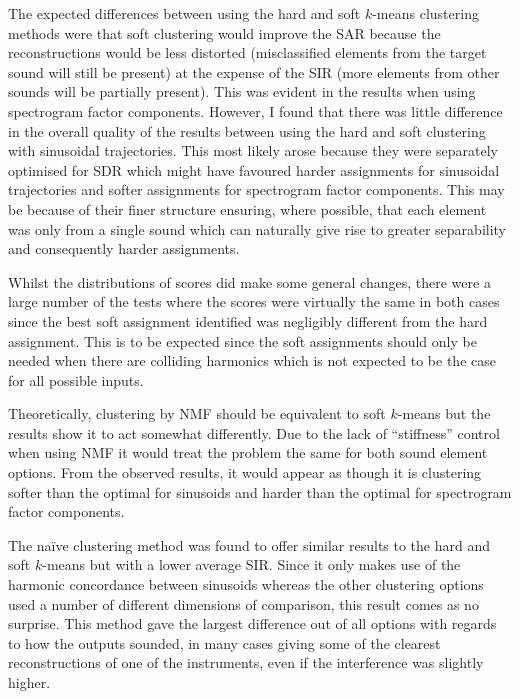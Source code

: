 \documentclass[12pt,a4paper,twoside,openright]{report}
\begin{document}

The expected differences between using the hard and soft $ k $-means clustering methods were that soft clustering would improve the SAR because the reconstructions would be less distorted (misclassified elements from the target sound will still be present) at the expense of the SIR (more elements from other sounds will be partially present). This was evident in the results when using spectrogram factor components. However, I found that there was little difference in the overall quality of the results between using the hard and soft clustering with sinusoidal trajectories. This most likely arose because they were separately optimised for SDR which might have favoured harder assignments for sinusoidal trajectories and softer assignments for spectrogram factor components. This may be because of their finer structure ensuring, where possible, that each element was only from a single sound which can naturally give rise to greater separability and consequently harder assignments.

Whilst the distributions of scores did make some general changes, there were a large number of the tests where the scores were virtually the same in both cases since the best soft assignment identified was negligibly different from the hard assignment. This is to be expected since the soft assignments should only be needed when there are colliding harmonics which is not expected to be the case for all possible inputs.


Theoretically, clustering by NMF should be equivalent to soft $ k $-means but the results show it to act somewhat differently. Due to the lack of ``stiffness'' control when using NMF it would treat the problem the same for both sound element options. From the observed results, it would appear as though it is clustering softer than the optimal for sinusoids and harder than the optimal for spectrogram factor components.

The na\"{i}ve clustering method was found to offer similar results to the hard and soft $ k $-means but with a lower average SIR. Since it only makes use of the harmonic concordance between sinusoids whereas the other clustering options used a number of different dimensions of comparison, this result comes as no surprise. This method gave the largest difference out of all options with regards to how the outputs sounded, in many cases giving some of the clearest reconstructions of one of the instruments, even if the interference was slightly higher.
\end{document}
